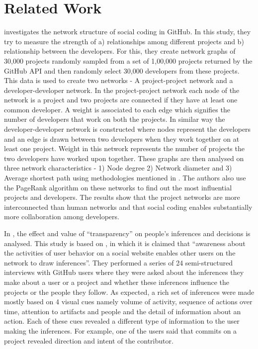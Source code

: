 
\section{Related Work}
\label{sec:related}

\cite{Thung2013} investigates the network structure of social coding in GitHub. In this study, they try to measure the strength of a) relationships among different projects and b) relationship between the developers. For this, they create network graphs of 30,000 projects randomly sampled from a set of 1,00,000 projects returned by the GitHub API and then randomly select 30,000 developers from these projects. This data is used to create two networks - A project-project network and a developer-developer network. In the project-project network each node of the network is a project and two projects are connected if they have at least one common developer. A weight is associated to each edge which signifies the number of developers that work on both the projects. In similar way the developer-developer network is constructed where nodes represent the developers and an edge is drawn between two developers when they work together on at least one project. Weight in this network represents the number of projects the two developers have worked upon together. These graphs are then analysed on three network characteristics - 1) Node degree 2) Network diameter and 3) Average shortest path using methodologies mentioned in \cite{Surian2010}. The authors also use the PageRank algorithm on these networks to find out the most influential projects and developers. The results show that the project networks are more interconnected than human networks and that social coding enables substantially more collaboration among developers.

In \cite{Dabbish2012}, the effect and value of ``transparency'' on people's inferences and decisions is analysed. This study is based on \cite{weiner2013}, in which it is claimed that ``awareness about the activities of user behavior on a social website enables other users on the network to draw inferences''. They performed a series of 24 semi-structured interviews with GitHub users where they were asked about the inferences they make about a user or a project and whether these inferences influence the projects or the people they follow. As expected, a rich set of inferences were made mostly based on 4 visual cues namely volume of activity, sequence of actions over time, attention to artifacts and people and the detail of information about an action. Each of these cues revealed a different type of information to the user making the inferences. For example, one of the users said that commits on a project revealed direction and intent of the contributor.
